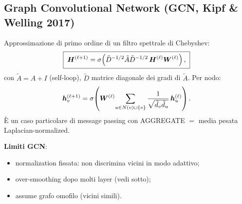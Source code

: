 \subsection{Graph Convolutional Network (GCN, Kipf \& Welling 2017)}
Approssimazione di primo ordine di un filtro spettrale di Chebyshev:
\begin{equation}\label{eq:gcn}
\boxed{\;\bm{H}^{(\ell+1)} = \sigma\!\left(\tilde D^{-1/2} \tilde A \tilde D^{-1/2}\, \bm{H}^{(\ell)} \bm{W}^{(\ell)}\right),\;}
\end{equation}
con $\tilde A = A + I$ (self-loop), $\tilde D$ matrice diagonale dei gradi di $\tilde A$. Per nodo:
\[
\bm{h}_v^{(\ell+1)} = \sigma\!\left(\bm{W}^{(\ell)}\!\sum_{u \in N(v) \cup \{v\}} \frac{1}{\sqrt{\tilde d_v \tilde d_u}}\, \bm{h}_u^{(\ell)}\right).
\]
È un caso particolare di message passing con AGGREGATE $=$ media pesata Laplacian-normalized.

\textbf{Limiti GCN}:
\begin{itemize}
  \item normalization fissata: non discrimina vicini in modo adattivo;
  \item over-smoothing dopo molti layer (vedi sotto);
  \item assume grafo omofilo (vicini simili).
\end{itemize}

